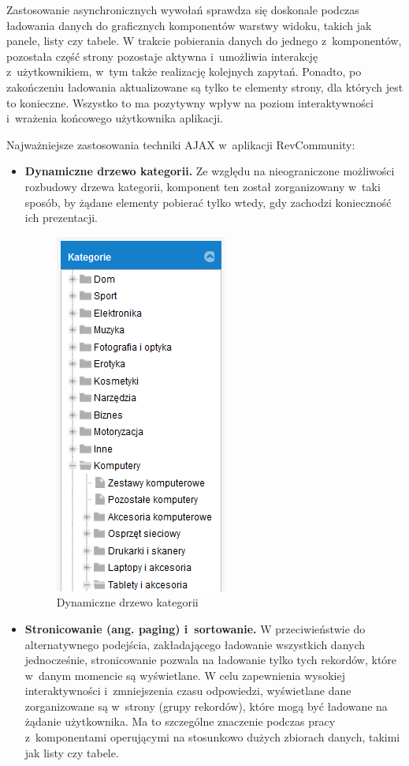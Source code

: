 Zastosowanie asynchronicznych wywołań sprawdza się doskonale podczas ładowania danych do graficznych komponentów warstwy widoku, takich jak panele, listy czy tabele. W trakcie pobierania danych do jednego z~komponentów, pozostała część strony pozostaje aktywna i~umożliwia interakcję z~użytkownikiem, w~tym także realizację kolejnych zapytań. Ponadto, po zakończeniu ładowania aktualizowane są tylko te elementy strony, dla których jest to konieczne. Wszystko to ma pozytywny wpływ na poziom interaktywności i~wrażenia końcowego użytkownika aplikacji.

Najważniejsze zastosowania techniki AJAX w~aplikacji RevCommunity:
\begin{itemize}
\item\textbf{Dynamiczne drzewo kategorii.} Ze względu na nieograniczone możliwości rozbudowy drzewa kategorii, komponent ten został zorganizowany w~taki sposób, by żądane elementy pobierać tylko wtedy, gdy zachodzi konieczność ich prezentacji.
\begin{figure}[H]
	\centering
	\includegraphics[scale=0.7]{images/Kategorie.png}
	\caption{Dynamiczne drzewo kategorii}
\end{figure}
\item\textbf{Stronicowanie (ang. paging) i~sortowanie.} W przeciwieństwie do alternatywnego podejścia, zakładającego ładowanie wszystkich danych jednocześnie, stronicowanie pozwala na ładowanie tylko tych rekordów, które w~danym momencie są wyświetlane. W celu zapewnienia wysokiej interaktywności i~zmniejszenia czasu odpowiedzi, wyświetlane dane zorganizowane są w~strony (grupy rekordów), które mogą być ładowane na żądanie użytkownika. Ma to szczególne znaczenie podczas pracy z~komponentami operującymi na stosunkowo dużych zbiorach danych, takimi jak listy czy tabele.

\end{itemize}
